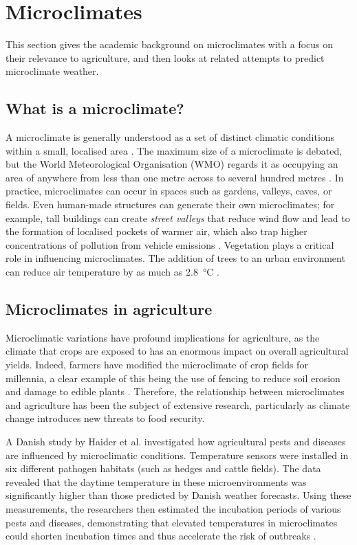 \section{Microclimates}

This section gives the academic background on microclimates with a focus on their
relevance to agriculture, and then looks at related attempts to predict
microclimate weather.

\subsection{What is a microclimate?}

A microclimate is generally understood as a set of distinct climatic conditions
within a small, localised area \cite{MetOffice2023}. The maximum size of a
microclimate is debated, but the World Meteorological Organisation (WMO) regards
it as occupying an area of anywhere from less than one metre across to several
hundred metres \cite{wmo2024}.  In practice, microclimates can occur in spaces
such as gardens, valleys, caves, or fields. Even human-made structures can
generate their own microclimates; for example, tall buildings can create
\emph{street valleys} that reduce wind flow and lead to the formation of
localised pockets of warmer air, which also trap higher concentrations of
pollution from vehicle emissions \cite{yang2023}. Vegetation plays a critical
role in influencing microclimates. The addition of trees to an urban environment
can reduce air temperature by as much as \SI{2.8}{\degreeCelsius}
\cite{lai2019}.

\subsection{Microclimates in agriculture}

Microclimatic variations have profound implications for agriculture, as the
climate that crops are exposed to has an enormous impact on overall agricultural
yields. Indeed, farmers have modified the microclimate of crop fields for
millennia, a clear example of this being the use of fencing to reduce soil
erosion and damage to edible plants \cite{cleugh1998}. Therefore, the
relationship between microclimates and agriculture has been the subject of
extensive research, particularly as climate change introduces new threats to
food security.

A Danish study by Haider et al. investigated how agricultural pests and diseases
are influenced by microclimatic conditions. Temperature sensors were installed
in six different pathogen habitats (such as hedges and cattle fields). The data
revealed that the daytime temperature in these microenvironments was
significantly higher than those predicted by Danish weather forecasts. Using
these measurements, the researchers then estimated the incubation periods of
various pests and diseases, demonstrating that elevated temperatures in
microclimates could shorten incubation times and thus accelerate the risk of
outbreaks \cite{haider2017}.

